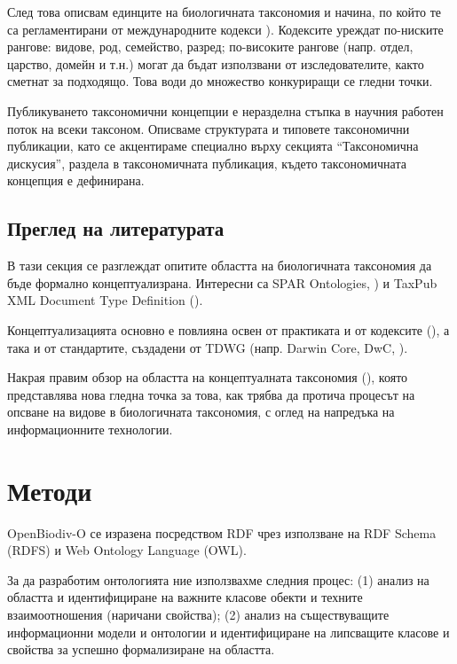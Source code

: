 След това описвам единците на биологичната таксономия и начина, по който те са регламентирани от международните кодекси \cite{international_commission_on_zoological_nomenclature_international_1999, noauthor_international_2012}). Кодексите уреждат по-ниските рангове: видове, род, семейство, разред; по-високите рангове (напр. отдел, царство, домейн и т.н.) могат да бъдат използвани от изследователите, както сметнат за подходящо. Това води до множество конкуриращи се гледни точки.

Публикуването таксономични концепции е неразделна стъпка в научния работен поток на всеки таксоном. Описваме структурата и типовете таксономични публикации, като се акцентираме специално върху секцията ``Таксономична дискусия'', раздела в таксономичната публикация, където таксономичната концепция е дефинирана.

\subsection*{Преглед на литературата}

В тази секция се разглеждат опитите областта на биологичната таксономия да бъде формално концептуализрана.  Интересни са SPAR Ontologies, \cite{peroni_semantic_2014}) и TaxPub XML Document Type Definition (\cite{catapano_taxpub:_2010}).

Концептуализацията основно е повлияна освен от практиката и от кодексите (\cite{international_commission_on_zoological_nomenclature_international_1999,noauthor_international_2012}), а така и от стандартите, създадени от TDWG (напр. Darwin Core, DwC, \cite{wieczorek_darwin_2012}).

Накрая правим обзор на областта на концептуалната таксономия (\cite{berendsohn_concept_1995, franz_perspectives:_2009,sterner_taxonomy_2017}), която представлява нова гледна точка за това, как трябва да протича процесът на опсване на видове в биологичната таксономия, с оглед на напредъка на информационните технологии.

\section{Методи}

OpenBiodiv-O се изразена посредством RDF чрез използване на RDF Schema (RDFS) и Web Ontology Language (OWL).

За да разработим онтологията ние използвахме следния процес: (1) анализ на областта и идентифициране на важните класове обекти и техните взаимоотношения (наричани свойства); (2) анализ на съществуващите информационни модели и онтологии и идентифициране на липсващите класове и свойства за успешно формализиране на областта.

